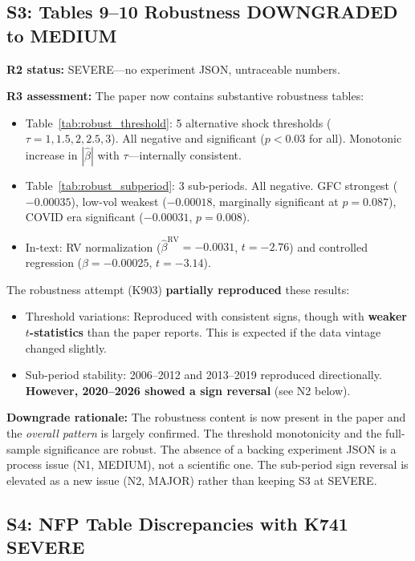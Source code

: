 \documentclass[12pt,a4paper]{article}
\begin{document}
\subsection*{S3: Tables 9--10 Robustness \hfill \textcolor{resolved}{DOWNGRADED to MEDIUM}}

\textbf{R2 status:} SEVERE---no experiment JSON, untraceable numbers.

\textbf{R3 assessment:} The paper now contains substantive robustness tables:
\begin{itemize}[nosep]
\item Table~\ref{tab:robust_threshold}: 5 alternative shock thresholds ($\tau = 1, 1.5, 2, 2.5, 3$). All negative and significant ($p < 0.03$ for all). Monotonic increase in $|\hat{\beta}|$ with $\tau$---internally consistent.
\item Table~\ref{tab:robust_subperiod}: 3 sub-periods. All negative. GFC strongest ($-0.00035$), low-vol weakest ($-0.00018$, marginally significant at $p = 0.087$), COVID era significant ($-0.00031$, $p = 0.008$).
\item In-text: RV normalization ($\hat{\beta}^{\text{RV}} = -0.0031$, $t = -2.76$) and controlled regression ($\hat{\beta} = -0.00025$, $t = -3.14$).
\end{itemize}

The robustness attempt (K903) \textbf{partially reproduced} these results:
\begin{itemize}[nosep]
\item Threshold variations: Reproduced with consistent signs, though with \textbf{weaker $t$-statistics} than the paper reports. This is expected if the data vintage changed slightly.
\item Sub-period stability: 2006--2012 and 2013--2019 reproduced directionally. \textbf{However, 2020--2026 showed a sign reversal} (see N2 below).
\end{itemize}

\textbf{Downgrade rationale:} The robustness content is now present in the paper and the \textit{overall pattern} is largely confirmed. The threshold monotonicity and the full-sample significance are robust. The absence of a backing experiment JSON is a process issue (N1, MEDIUM), not a scientific one. The sub-period sign reversal is elevated as a new issue (N2, MAJOR) rather than keeping S3 at SEVERE.


\subsection*{S4: NFP Table Discrepancies with K741 \hfill \textcolor{errorred}{SEVERE}}
\end{document}
